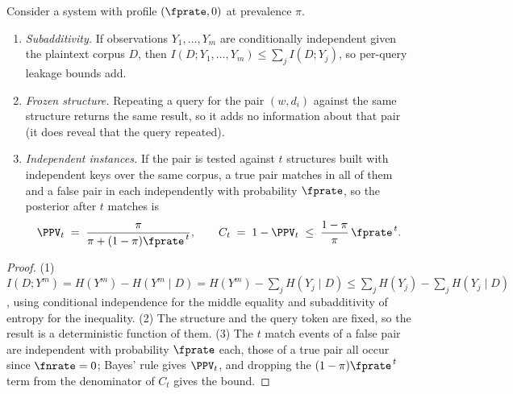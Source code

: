 \begin{proposition}
\label{prop:multi-query-leakage}
Consider a system with profile $(\fprate, 0)$ at prevalence $\pi$.
\begin{enumerate}
\item \emph{Subadditivity.} If observations $Y_1, \ldots, Y_m$ are
  conditionally independent given the plaintext corpus $D$, then
  $I(D; Y_1, \ldots, Y_m) \le \sum_{j} I(D; Y_j)$, so per-query leakage
  bounds add.
\item \emph{Frozen structure.} Repeating a query for the pair $(w, d_i)$
  against the same structure returns the same result, so it adds no
  information about that pair (it does reveal that the query repeated).
\item \emph{Independent instances.} If the pair is tested against $t$
  structures built with independent keys over the same corpus, a true
  pair matches in all of them and a false pair in each independently with
  probability $\fprate$, so the posterior after $t$ matches is
  \[
    \PPV_t \;=\; \frac{\pi}{\pi + (1 - \pi)\fprate^{\,t}},
    \qquad
    C_t \;=\; 1 - \PPV_t \;\le\; \frac{1 - \pi}{\pi}\,\fprate^{\,t}.
  \]
\end{enumerate}
\end{proposition}

\begin{proof}
(1) $I(D; Y^m) = H(Y^m) - H(Y^m \mid D) = H(Y^m) - \sum_j H(Y_j \mid D)
\le \sum_j H(Y_j) - \sum_j H(Y_j \mid D)$, using conditional independence
for the middle equality and subadditivity of entropy for the inequality.
(2) The structure and the query token are fixed, so the result is a
deterministic function of them. (3) The $t$ match events of a false pair
are independent with probability $\fprate$ each, those of a true pair all
occur since $\fnrate = 0$; Bayes' rule gives $\PPV_t$, and dropping the
$(1 - \pi)\fprate^{\,t}$ term from the denominator of $C_t$ gives the
bound.
\end{proof}

